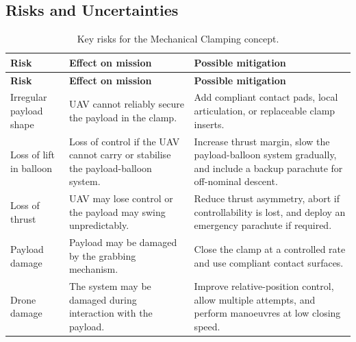 \subsection{Risks and Uncertainties}
{
\small
\setlength{\LTleft}{0pt}
\setlength{\LTright}{0pt}

\begin{longtable}{p{} p{} p{}}
\caption{Key risks for the Mechanical Clamping concept.}
\label{tab:conceptC_key_risks} \\
\toprule
\textbf{Risk} & \textbf{Effect on mission} & \textbf{Possible mitigation} \\
\midrule
\endfirsthead

\toprule
\textbf{Risk} & \textbf{Effect on mission} & \textbf{Possible mitigation} \\
\midrule
\endhead

\bottomrule
\endfoot

Irregular payload shape  & UAV cannot reliably secure the payload in the clamp. & Add compliant contact pads, local articulation, or replaceable clamp inserts.\\
Loss of lift in balloon & Loss of control if the UAV cannot carry or stabilise the payload-balloon system. & Increase thrust margin, slow the payload-balloon system gradually, and include a backup parachute for off-nominal descent. \\
Loss of thrust & UAV may lose control or the payload may swing unpredictably. & Reduce thrust asymmetry, abort if controllability is lost, and deploy an emergency parachute if required. \\
Payload damage & Payload may be damaged by the grabbing mechanism. & Close the clamp at a controlled rate and use compliant contact surfaces. \\
Drone damage & The system may be damaged during interaction with the payload. & Improve relative-position control, allow multiple attempts, and perform manoeuvres at low closing speed. \\

\end{longtable}
}









































